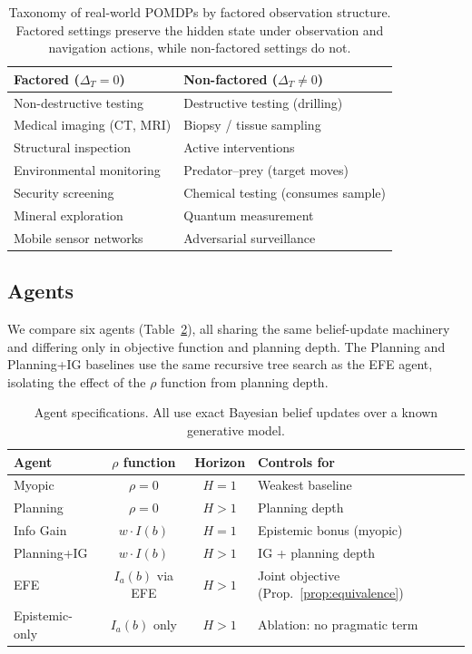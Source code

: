 \documentclass[runningheads]{llncs}
\begin{document}
\begin{table}[ht]
\centering
\caption{Taxonomy of real-world POMDPs by factored observation structure. Factored settings preserve the hidden state under observation and navigation actions, while non-factored settings do not.}
\label{tab:taxonomy}
\begin{small}
\begin{tabular}{p{3.6cm}p{4.2cm}}
\toprule
\textbf{Factored} ($\Delta_T{=}0$) & \textbf{Non-factored} ($\Delta_T{\neq}0$) \\
\midrule
Non-destructive testing & Destructive testing (drilling) \\
Medical imaging (CT, MRI) & Biopsy / tissue sampling \\
Structural inspection & Active interventions \\
Environmental monitoring & Predator--prey (target moves) \\
Security screening & Chemical testing (consumes sample) \\
Mineral exploration & Quantum measurement \\
Mobile sensor networks & Adversarial surveillance \\
\bottomrule
\end{tabular}
\end{small}
\end{table}

\subsection{Agents}

We compare six agents (Table~\ref{tab:agents}), all sharing the same belief-update machinery and differing only in objective function and planning depth. The Planning and Planning+IG baselines use the same recursive tree search as the EFE agent, isolating the effect of the $\rho$ function from planning depth.

\begin{table}[ht]
\centering
\caption{Agent specifications. All use exact Bayesian belief updates over a known generative model.}
\label{tab:agents}
\begin{small}
\begin{tabular}{lccl}
\toprule
Agent & $\rho$ function & Horizon & Controls for \\
\midrule
Myopic & $\rho = 0$ & $H{=}1$ & Weakest baseline \\
Planning & $\rho = 0$ & $H > 1$ & Planning depth \\
Info Gain & $w \cdot I(b)$ & $H{=}1$ & Epistemic bonus (myopic) \\
Planning+IG & $w \cdot I(b)$ & $H > 1$ & IG + planning depth \\
EFE & $I_a(b)$ via EFE & $H > 1$ & Joint objective (Prop.~\ref{prop:equivalence}) \\
Epistemic-only & $I_a(b)$ only & $H > 1$ & Ablation: no pragmatic term \\
\bottomrule
\end{tabular}
\end{small}
\end{table}
\end{document}
